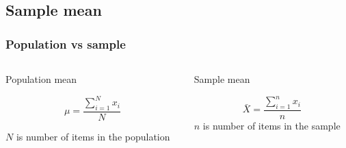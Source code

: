 \documentclass{beamer}
\begin{document}
    \subsection{Sample mean}
    \begin{frame}
        \frametitle{Population vs sample}
        \begin{columns}
            \begin{column}{0.4\textwidth}  %
                \begin{center}
                    \begin{block}{Population mean}
                        
                        \begin{equation}    %
                            \mu = \frac{\sum_{i=1}^N x_i}{N}
                        \end{equation}

                        $N$ is number of items in the population
                    \end{block}
                \end{center}
            \end{column}
            \begin{column}{0.4\textwidth}  %
                \begin{center}
                    \begin{block}{Sample mean}
                        
                        \begin{equation}    %
                            \bar{{X}} = \frac{\sum_{i=1}^n x_i}{n}
                        \end{equation}
                        $n$ is number of items in the sample
                    \end{block}
                \end{center}
            \end{column}
        \end{columns}
    \end{frame}    
    
\end{document}
